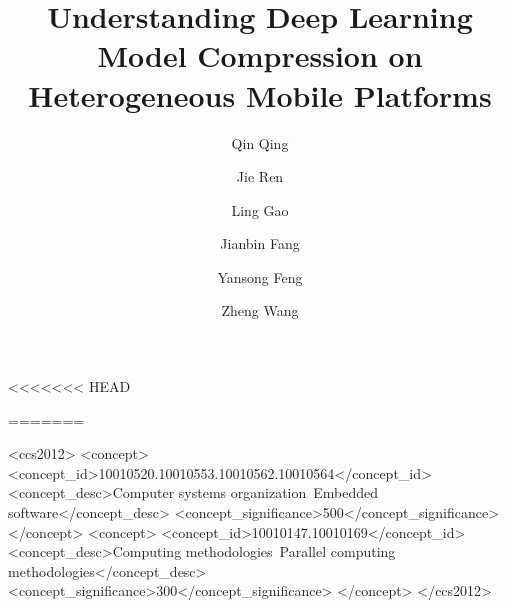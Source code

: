 \documentclass[conference,compsoc]{IEEEtran}
\begin{document}
\title{Understanding Deep Learning Model Compression on Heterogeneous Mobile Platforms}

<<<<<<< HEAD
\author{
 }
=======





\author{Qin Qing}
\author{Jie Ren}
 
\author{Ling Gao}

\author{Jianbin Fang}

\author{Yansong Feng}

\author{Zheng Wang}


%
%
\begin{CCSXML}
<ccs2012> <concept> <concept_id>10010520.10010553.10010562.10010564</concept_id> <concept_desc>Computer systems organization~Embedded
software</concept_desc> <concept_significance>500</concept_significance> </concept> <concept> <concept_id>10010147.10010169</concept_id>
<concept_desc>Computing methodologies~Parallel computing methodologies</concept_desc> <concept_significance>300</concept_significance>
</concept> </ccs2012>
\end{CCSXML}
\end{document}

